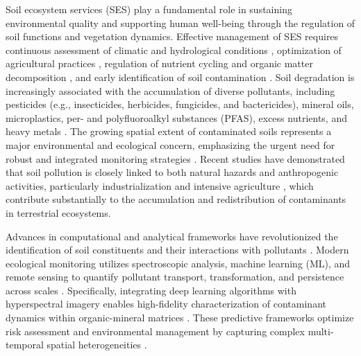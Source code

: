 \documentclass[preprint,12pt]{elsarticle}            %
\begin{document}
Soil ecosystem services (SES) play a fundamental role in sustaining
environmental quality and supporting human well-being through the regulation
of soil functions and vegetation dynamics. Effective management of SES
requires continuous assessment of climatic and hydrological conditions
\cite{Lal2020,Robinson2014}, optimization of agricultural practices
\cite{Hepperly2009,Rahman2014}, regulation of nutrient cycling and organic
matter decomposition \cite{Atoloye2024,Ma2024,Vishwanath2025}, and early
identification of soil contamination
\cite{Pan2019,Fan2025,Lemenkova2025b,Proshad2025}. Soil degradation is
increasingly associated with the accumulation of diverse pollutants,
including pesticides (e.g., insecticides, herbicides, fungicides, and
bactericides), mineral oils, microplastics, per- and polyfluoroalkyl
substances (PFAS), excess nutrients, and heavy metals
\cite{Shen2024,Guan2024,Baghaie2020,Luo2017}. The growing spatial extent of
contaminated soils represents a major environmental and ecological concern,
emphasizing the urgent need for robust and integrated monitoring strategies
\cite{Liu2020,Zhang2021,Lemenkova2025d}. Recent studies have demonstrated
that soil pollution is closely linked to both natural hazards and
anthropogenic activities, particularly industrialization
\cite{Rosskopfova2012,Guo2025,Zhang2022} and intensive agriculture
\cite{Hepperly2009,Rahman2014,Pan2019}, which contribute substantially to the
accumulation and redistribution of contaminants in terrestrial ecosystems.

Advances in computational and analytical frameworks have revolutionized the
identification of soil constituents and their interactions with pollutants
\cite{Liu2020,Zhang2021}. Modern ecological monitoring utilizes spectroscopic
analysis, machine learning (ML), and remote sensing to quantify pollutant
transport, transformation, and persistence across scales
\cite{Fan2025,Lemenkova2025d}. Specifically, integrating deep learning
algorithms with hyperspectral imagery enables high-fidelity characterization
of contaminant dynamics within organic-mineral matrices \cite{Xu2026,Li2023}.
These predictive frameworks optimize risk assessment and environmental
management by capturing complex multi-temporal spatial heterogeneities
\cite{Proshad2025,Feng2024}.
\end{document}
